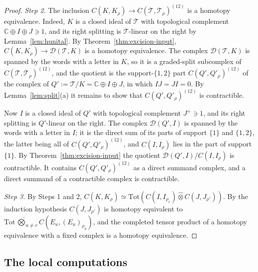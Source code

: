 \documentclass[11pt]{amsart}
\theoremstyle{definition}
\theoremstyle{remark}
\newcommand{\C}{\mathbb C}
\begin{document}
\begin{proof}
\emph{Step 2.}  The inclusion $C(K,K_{\rho})\to C(\mathcal T,\mathcal T_{\rho})^{(12)}$ is a
homotopy equivalence.  Indeed, $K$ is a closed ideal of $\mathcal T$ with topological
complement $\C\oplus I\oplus J\ni1$, and its right splitting is $\mathcal T$-linear on
the right by Lemma~\ref{lem:hunital}.  By Theorem~\ref{thm:excision-input},
$C(K,K_{\rho})\to\mathcal D(\mathcal T,K)$ is a homotopy equivalence.  The complex
$\mathcal D(\mathcal T,K)$ is spanned by the words with a letter in $K$, so it is a
graded-split subcomplex of $C(\mathcal T,\mathcal T_{\rho})^{(12)}$, and the quotient is the
support-$\{1,2\}$ part $C(Q',Q'_{\rho})^{(12)}$ of the complex of
$Q':=\mathcal T/K=\C\oplus I\oplus J$, in which $IJ=JI=0$.  By
Lemma~\ref{lem:split}(a) it remains to show that
$C(Q',Q'_{\rho})^{(12)}$ is contractible.

Now $I$ is a closed ideal of $Q'$ with topological complement $J^{+}\ni1$, and its
right splitting is $Q'$-linear on the right.  The complex $\mathcal D(Q',I)$ is
spanned by the words with a letter in $I$; it is the direct sum of its parts
of support $\{1\}$ and $\{1,2\}$, the latter being all of
$C(Q',Q'_{\rho})^{(12)}$, and $C(I,I_{\rho})$ lies in the part of support
$\{1\}$.  By Theorem~\ref{thm:excision-input} the quotient
$\mathcal D(Q',I)/C(I,I_{\rho})$ is contractible.  It contains
$C(Q',Q'_{\rho})^{(12)}$ as a direct summand complex, and a direct summand of
a contractible complex is contractible.

\emph{Step 3.}  By Steps 1 and 2, $C(K,K_{\rho})\simeq
\mathrm{Tot}(C(I,I_{\rho_v})\widehat\otimes C(J,J_{\rho'}))$.  By the
induction hypothesis $C(J,J_{\rho'})$ is homotopy equivalent to
$\mathrm{Tot}\,\widehat\bigotimes_{u\ne v}C(E_u,(E_u)_{\rho_u})$, and the
completed tensor product of a homotopy equivalence with a fixed complex is a
homotopy equivalence.
\end{proof}

\subsection{The local computations}
\end{document}
